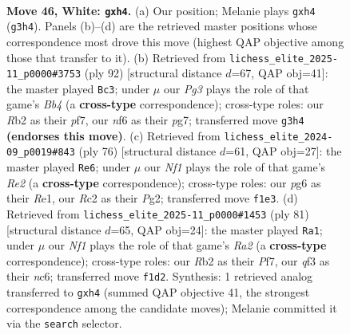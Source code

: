 \documentclass[11pt]{article}
\begin{document}
\clearpage

\begin{figure}[p]\centering
\begin{subfigure}{0.46\textwidth}\centering
\resizebox{\linewidth}{!}{%
\newchessgame
\chessboard[
  setfen={6k1/1b3p2/5np1/8/7p/5qP1/1RR4P/5NK1 w - - 0 46},
  showmover=false,
  pgfstyle=straightmove, color=movearrow, markmove={g3-h4}
]}
\caption{}
\end{subfigure}\hfill
\begin{subfigure}{0.46\textwidth}\centering
\resizebox{\linewidth}{!}{%
\newchessgame
\chessboard[
  setfen={8/5pp1/7k/pq1N3p/1B1KP3/4R2P/8/8 w - - 0 47},
  showmover=false,
  pgfstyle=straightmove, color=movearrow, markmove={b4-c3}
]}
\caption{}
\end{subfigure}
\\[4pt]
\begin{subfigure}{0.46\textwidth}\centering
\resizebox{\linewidth}{!}{%
\newchessgame
\chessboard[
  setfen={8/p5kp/2q5/3p4/2P5/1P1b4/4R1PP/4R2K w - - 1 39},
  showmover=false,
  pgfstyle=straightmove, color=movearrow, markmove={e2-e6}
]}
\caption{}
\end{subfigure}\hfill
\begin{subfigure}{0.46\textwidth}\centering
\resizebox{\linewidth}{!}{%
\newchessgame
\chessboard[
  setfen={r7/r4pk1/2N4p/3Q2p1/8/4P1P1/5PP1/3n2K1 b - - 4 41},
  showmover=false,
  pgfstyle=straightmove, color=movearrow, markmove={a7-a1}
]}
\caption{}
\end{subfigure}
\caption{\textbf{Move 46, White: \texttt{gxh4}.} (a) Our position; Melanie plays \texttt{gxh4} (\texttt{g3h4}). Panels (b)--(d) are the retrieved master positions whose correspondence most drove this move (highest QAP objective among those that transfer to it). (b) Retrieved from \texttt{lichess\_elite\_2025-11\_p0000\#3753} (ply 92) [structural distance $d$=67, QAP obj=41]: the master played \texttt{Bc3}; under $\mu$ our \emph{Pg3} plays the role of that game's \emph{Bb4} (a \textbf{cross-type} correspondence); cross-type roles: our \emph{R}b2 as their \emph{p}f7, our \emph{n}f6 as their \emph{p}g7; transferred move \texttt{g3h4} \textbf{(endorses this move)}. (c) Retrieved from \texttt{lichess\_elite\_2024-09\_p0019\#843} (ply 76) [structural distance $d$=61, QAP obj=27]: the master played \texttt{Re6}; under $\mu$ our \emph{Nf1} plays the role of that game's \emph{Re2} (a \textbf{cross-type} correspondence); cross-type roles: our \emph{p}g6 as their \emph{R}e1, our \emph{R}c2 as their \emph{P}g2; transferred move \texttt{f1e3}. (d) Retrieved from \texttt{lichess\_elite\_2025-11\_p0000\#1453} (ply 81) [structural distance $d$=65, QAP obj=24]: the master played \texttt{Ra1}; under $\mu$ our \emph{Nf1} plays the role of that game's \emph{Ra2} (a \textbf{cross-type} correspondence); cross-type roles: our \emph{R}b2 as their \emph{P}f7, our \emph{q}f3 as their \emph{n}c6; transferred move \texttt{f1d2}. Synthesis: 1 retrieved analog transferred to \texttt{gxh4} (summed QAP objective 41, the strongest correspondence among the candidate moves); Melanie committed it via the \texttt{search} selector.}
\label{fig:thought-m90}
\end{figure}
\end{document}
